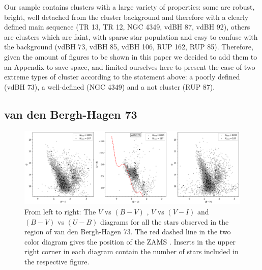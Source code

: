 \documentclass[draft]{aa}
\begin{document}
Our sample contains clusters with a large variety of properties: some are
robust, bright, well detached from the cluster background and therefore with a
clearly defined main sequence (TR 13, TR 12, NGC 4349, vdBH 87, vdBH 92),
others are clusters which are faint, with sparse star population and easy to
confuse with the background (vdBH 73, vdBH 85, vdBH 106, RUP 162, RUP 85).
Therefore, given the amount of figures to be shown in this paper we decided to
add them to an Appendix to save space, and limited ourselves here to present
the case of two extreme types of cluster according to the statement above: a
poorly defined (vdBH 73), a well-defined (NGC 4349) and a not cluster 
(RUP 87).


\subsection{van den Bergh-Hagen 73}

\begin{figure}[ht]
    \centering
    \includegraphics[width=\hsize]{../figs/obs_vdBH73.png}
    \caption{From left to right: The $V$ vs $(B-V)$ , $V$ vs $(V-I)$ and
    $(B-V)$ vs $(U-B)$ diagrams for all the stars observed in the region of van
    den Bergh-Hagen 73.
    The red dashed line in the two color diagram gives the position of the ZAMS
    \citep{Aller1982}. Inserts in the upper right corner in each
    diagram contain the number of stars included in the respective figure.}
    \label{fig3}
\end{figure}
\end{document}
